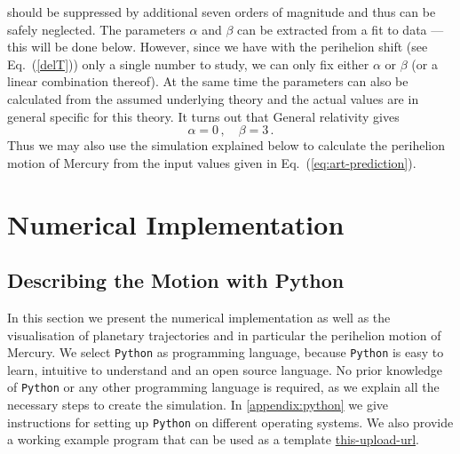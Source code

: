 \documentclass[12pt,ngerman,american]{iopart}
\newcommand{\python}[0]{\texttt{Python}}
\begin{document}
should be suppressed by additional seven orders of magnitude and thus can be safely neglected.
The parameters $\alpha$ and $\beta$ can be extracted from a fit to data --- this will be done below.
However, since we have with the perihelion shift (see Eq.~(\ref{delT})) only a single number to study,
we can only fix either $\alpha$ or $\beta$ (or a linear combination thereof).
At the same time the parameters can also be calculated from the assumed underlying theory and the actual values
are in general specific for this theory. It turns out that
General relativity gives~\cite{Einstein}
\begin{equation}\label{eq:art-prediction}
	\alpha = 0 \, , \quad \beta = 3 \, .
\end{equation}
Thus we may also use the simulation explained below to calculate the perihelion motion of Mercury from the input
values given in Eq.~(\ref{eq:art-prediction}).






\section{Numerical Implementation}\label{sec:Numerical Implementation}

\subsection{Describing the Motion with Python}

In this section we present the numerical implementation as well as the visualisation of planetary trajectories and in
particular
the perihelion motion of Mercury.  We select \python{} \cite{Python} as  programming language, because \python{} is easy to learn, intuitive to understand and an open source language.
No prior knowledge of \python{} or any other programming language is required, as we explain all the necessary steps to create the simulation.
In  \ref{appendix:python} we give instructions for setting up \python{} on different operating systems.
We also provide a working example program that can be used as a template \url{this-upload-url}.
\end{document}

